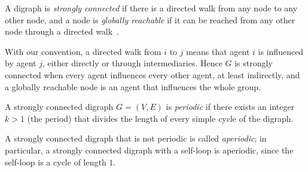 A digraph is \emph{strongly connected} if there is a directed walk from any node to any
other node, and a node is \emph{globally reachable} if it can be reached from any other
node through a directed walk~\cite{baggio_graph}.

With our convention, a directed walk from $i$ to $j$ means that agent $i$ is
influenced by agent $j$, either directly or through intermediaries. Hence $G$ is
strongly connected when every agent influences every other agent, at least
indirectly, and a globally reachable node is an agent that influences the whole
group.

\begin{definition}
\label{def:periodic}
A strongly connected digraph $G = (V, E)$ is \emph{periodic} if there exists an
integer $k > 1$ (the period) that divides the length of every simple cycle of the
digraph.
\end{definition}

A strongly connected digraph that is not periodic is called \emph{aperiodic}; in
particular, a strongly connected digraph with a self-loop is aperiodic, since the
self-loop is a cycle of length $1$.

